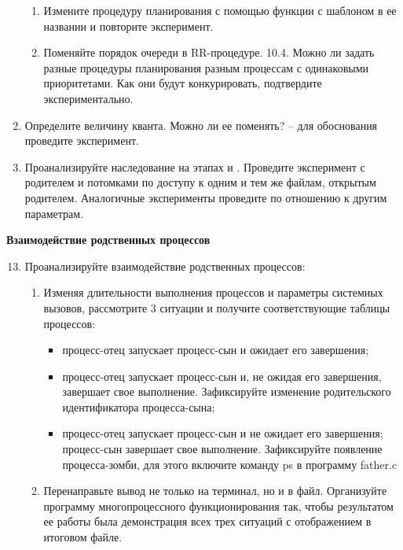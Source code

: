 \begin{enumerate}
\begin{enumerate}
			\item Измените процедуру планирования с помощью функции с шаблоном  в ее названии и повторите эксперимент.
			\item Поменяйте порядок очереди в RR-процедуре. 10.4. Можно ли задать разные процедуры планирования разным процессам с одинаковыми приоритетами. Как они будут конкурировать, подтвердите экспериментально.
		\end{enumerate}
	\item  Определите величину кванта. Можно ли ее поменять? – для обоснования проведите эксперимент.
	\item  Проанализируйте наследование на этапах  и . Проведите эксперимент с родителем и потомками по доступу к одним и тем же файлам, открытым родителем. Аналогичные эксперименты проведите по отношению к другим параметрам. 
\end{enumerate}

\textbf{Взаимодействие родственных процессов}

\begin{enumerate}
	\setcounter{enumi}{12}
	\item Проанализируйте взаимодействие родственных процессов:
		\begin{enumerate}
			\item Изменяя длительности выполнения процессов и параметры
			системных вызовов, рассмотрите 3 ситуации и получите соответствующие
			таблицы процессов:
				\begin{itemize}
					\item процесс-отец запускает процесс-сын и ожидает его завершения;
					\item процесс-отец запускает процесс-сын и, не ожидая его завершения,
					завершает свое выполнение. Зафиксируйте изменение родительского
					идентификатора процесса-сына;
					\item процесс-отец запускает процесс-сын и не ожидает его завершения;
					процесс-сын завершает свое выполнение. Зафиксируйте появление
					процесса-зомби, для этого включите команду ps в программу father.c
				\end{itemize}

			\item Перенаправьте вывод не только на терминал, но и в файл.
			Организуйте программу многопроцессного функционирования так, чтобы
			результатом ее работы была демонстрация всех трех ситуаций с
			отображением в итоговом файле.
		\end{enumerate}
\end{enumerate}

